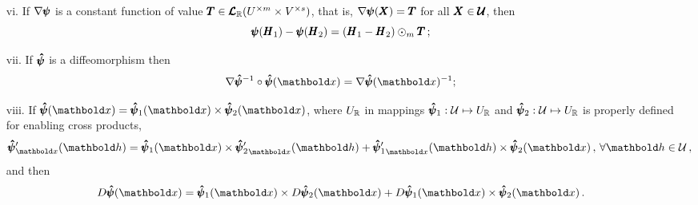 \begin{itemize}
\begin{equation}
	\end{equation}
	\item[vi.] If $\nabla\pmb{\psi}$ is a constant function of value $\pmb{T}\in\pmb{\mathcal{L}}_{\mathbb{R}}(U^{\times m}\times V^{\times s})$, that is, $\nabla\pmb{\psi}(\pmb{X})=\pmb{T}$ for all $\pmb{X}\in\pmb{\mathcal{U}}$, then 
	\begin{equation}\label{eq:gradConst}
	\pmb{\psi}(\pmb{H}_1)-\pmb{\psi}(\pmb{H}_2)=(\pmb{H}_1-\pmb{H}_2)\odot_m\pmb{T}\,;
	\end{equation}
	\item[vii.] If $\pmb{\hat\psi}$ is a diffeomorphism then 
	\begin{equation}\label{eq:gradDiffeo2}
	\fua{\nabla\tnr{\hat\psi}^{-1}\circ\tnr{\hat\psi}}{\vto{x}}=\fua{\nabla\tnr{\hat\psi}}{\vto{x}}^{-1};
	\end{equation}
	\item[viii.] If $\fua{\tnr{\hat\psi}}{\vto{x}}=\fua{\tnr{\hat\psi}_1}{\vto{x}}\times\fua{\tnr{\hat\psi}_2}{\vto{x}}$, where $U_{\mathbb{R}}$ in mappings  $\pmb{\hat\psi}_1 : {\mathcal{U}} \mapsto U_{\mathbb{R}}$ and $\pmb{\hat\psi}_2 : {\mathcal{U}} \mapsto U_{\mathbb{R}}$ is properly defined for enabling cross products, 
\begin{equation}\label{eq:crossRule}
\fua{\tnr{\hat\psi}'_{\vto{x}}}{\vto{h}} = \fua{\tnr{\hat\psi}_1}{\vto{x}}\times\fua{{\tnr{\hat\psi}_2'}_{\vto{x}}}{\vto{h}} + \fua{{\tnr{\hat\psi}_1'}_{\vto{x}}}{\vto{h}} \times \fua{\tnr{\hat\psi}_2}{\vto{x}}\,,\,\forall \vto{h}\in\mathcal{U}\,,
\end{equation}
and then 
	\begin{equation}\label{eq:prop3Grad}
	\fua{D\tnr{\hat\psi}}{\vto{x}} = \fua{\tnr{\hat\psi}_1}{\vto{x}}\times\fua{D\tnr{\hat\psi}_2}{\vto{x}}+\fua{D\tnr{\hat\psi}_1}{\vto{x}}\times\fua{\tnr{\hat\psi}_2}{\vto{x}}\,.
	\end{equation}
\end{itemize}


